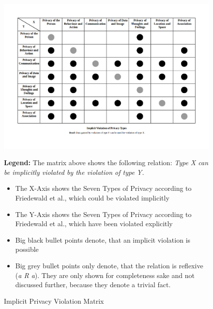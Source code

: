 \begin{figure}
\centering
\includegraphics[width=\textwidth]{diagrams/png/implicit-privacy-violation-matrix.png}

\begin{flushleft}
\scriptsize
\textbf{Legend:}
The matrix above shows the following relation: \emph{Type X can be
implicitly violated by the violation of type Y.}
\begin{itemize}
\itemsep1pt\parskip0pt
\item
  The X-Axis shows the Seven Types of Privacy according to Friedewald et
  al., which could be violated implicitly
\item
  The Y-Axis shows the Seven Types of Privacy according to Friedewald et
  al., which have been violated explicitly
\item
  Big black bullet points denote, that an implicit violation is possible
\item
  Big grey bullet points only denote, that the relation is reflexive
  (\emph{a R a}). They are only shown for completeness sake and not
  discussed further, because they denote a trivial fact.
\end{itemize}
\end{flushleft}

\caption{Implicit Privacy Violation Matrix}
\label{figure:Implicit Privacy Violation Matrix}
\end{figure}
